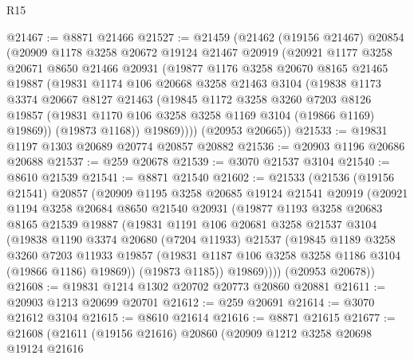 \begin{lexlean}{R15}
\begin{coremodule}
@21467 := @8871 @21466
@21527 := @21459
    (@21462
      (@19156 @21467)
      @20854
      (@20909
        @1178
        @3258
        @20672
        @19124
        @21467
        @20919
        (@20921
          @1177
          @3258
          @20671
          @8650
          @21466
          @20931
          (@19877
            @1176
            @3258
            @20670
            @8165
            @21465
            @19887
            (@19831
              @1174
              @106
              @20668
              @3258
              @21463
              @3104
              (@19838
                @1173
                @3374
                @20667
                @8127
                @21463
                (@19845
                  @1172
                  @3258
                  @3260
                  @7203
                  @8126
                  @19857
                  (@19831 @1170 @106 @3258 @3258 @1169 @3104 (@19866 @1169) @19869))
                (@19873 @1168))
              @19869))))
      (@20953 @20665))
@21533 := @19831 @1197 @1303 @20689 @20774 @20857 @20882
@21536 := @20903 @1196 @20686 @20688
@21537 := @259 @20678
@21539 := @3070 @21537 @3104
@21540 := @8610 @21539
@21541 := @8871 @21540
@21602 := @21533
    (@21536
      (@19156 @21541)
      @20857
      (@20909
        @1195
        @3258
        @20685
        @19124
        @21541
        @20919
        (@20921
          @1194
          @3258
          @20684
          @8650
          @21540
          @20931
          (@19877
            @1193
            @3258
            @20683
            @8165
            @21539
            @19887
            (@19831
              @1191
              @106
              @20681
              @3258
              @21537
              @3104
              (@19838
                @1190
                @3374
                @20680
                (@7204 @11933)
                @21537
                (@19845
                  @1189
                  @3258
                  @3260
                  @7203
                  @11933
                  @19857
                  (@19831 @1187 @106 @3258 @3258 @1186 @3104 (@19866 @1186) @19869))
                (@19873 @1185))
              @19869))))
      (@20953 @20678))
@21608 := @19831 @1214 @1302 @20702 @20773 @20860 @20881
@21611 := @20903 @1213 @20699 @20701
@21612 := @259 @20691
@21614 := @3070 @21612 @3104
@21615 := @8610 @21614
@21616 := @8871 @21615
@21677 := @21608
    (@21611
      (@19156 @21616)
      @20860
      (@20909
        @1212
        @3258
        @20698
        @19124
        @21616

\end{coremodule}
\end{lexlean}
